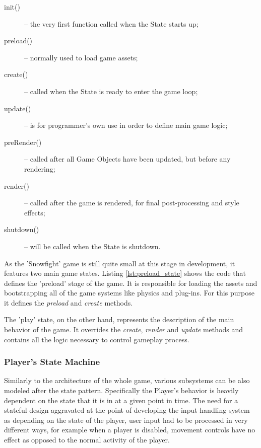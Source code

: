 \begin{description}

\item [init()] -- the very first function called when the State starts up;

\item [preload()] -- normally used to load game assets;

\item [create()] -- called when the State is ready to enter the game loop;

\item [update()] -- is for programmer's own use in order to define main game logic;

\item [preRender()] -- called after all Game Objects have been updated, but before any rendering;

\item [render()] -- called after the game is rendered, for final post-processing and style effects;

\item [shutdown()] -- will be called when the State is shutdown.

\end{description}


As the 'Snowfight' game is still quite small at this stage in development, it
features two main game states. Listing \ref{lst:preload_state} shows the code
that defines the 'preload' stage of the game. It is responsible for loading the
assets and bootstrapping all of the game systems like physics and plug-ins. For
this purpose it defines the \emph{preload} and \emph{create} methods.



The 'play' state, on the other hand, represents the description of the main
behavior of the game. It overrides the \emph{create}, \emph{render} and
\emph{update} methods and contains all the logic necessary to control gameplay
process.

\subsubsection{Player's State Machine}

Similarly to the architecture of the whole game, various subsystems can be also
modeled after the state pattern. Specifically the Player's behavior is heavily
dependent on the state that it is in at a given point in time. The need for a
stateful design aggravated at the point of developing the input handling system
as depending on the state of the player, user input had to be processed in very
different ways, for example when a player is disabled, movement controls have no
effect as opposed to the normal activity of the player.

